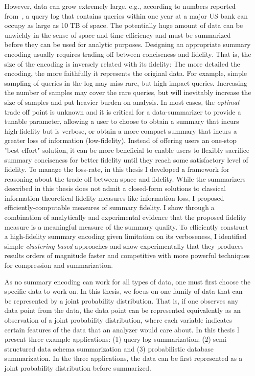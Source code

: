 However, data can grow extremely large, e.g., according to numbers reported from~\cite{DBLP:conf/www/KulLXCCKU16}, a query log that contains queries within one year at a major US bank can occupy as large as 10 TB of space. 
The potentially huge amount of data can be unwieldy in the sense of space and time efficiency and must be summarized before they can be used for analytic purposes. 
Designing an appropriate summary encoding usually requires trading off between conciseness and fidelity.
That is, the size of the encoding is inversely related with its fidelity: The more detailed the encoding, the more faithfully it represents the original data.
For example, simple sampling of queries in the log may miss rare, but high impact queries.
Increasing the number of samples may cover the rare queries, but will inevitably increase the size of samples and put heavier burden on analysis.
In most cases, the \emph{optimal} trade off point is unknown and it is critical for a data-summarizer to provide a tunable parameter, allowing a user to choose to obtain a summary that incurs high-fidelity but is verbose, or obtain a more compact summary that incurs a greater loss of information (low-fidelity).
Instead of offering users an one-stop "best effort" solution, it can be more beneficial to enable users to flexibly sacrifice summary conciseness for better fidelity until they reach some satisfactory level of fidelity. 
To manage the loss-rate, in this thesis I developed a framework for reasoning about the trade off between space and fidelity.
While the summarizers described in this thesis does not admit a closed-form solutions to classical information theoretical fidelity measures like information loss, I proposed efficiently-computable measures of summary fidelity.
I show through a combination of analytically and experimental evidence that the proposed fidelity measure is a meaningful measure of the summary quality.
To efficiently construct a high-fidelity summary encoding given limitation on its verboseness, I identified simple \emph{clustering-based} approaches and show experimentally that they produces results orders of magnitude faster and competitive with more powerful techniques for compression and summarization.

As no summary encoding can work for all types of data, one must first choose the specific data to work on. 
In this thesis, we focus on one family of data that can be represented by a joint probability distribution.
That is, if one observes any data point from the data, the data point can be represented equivalently as an observation of a joint probability distribution, where each variable indicates certain features of the data that an analyzer would care about.
In this thesis I present three example applications: (1) query log summarization; (2) semi-structured data schema summarization and (3) probabilistic database summarization.
In the three applications, the data can be first represented as a joint probability distribution before summarized.

